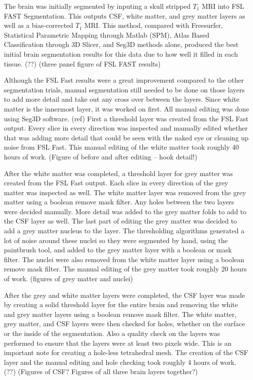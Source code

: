 The brain was initially segmented by inputing a skull stripped $T_1$ MRI into FSL FAST Segmentation. This outputs CSF, white matter, and grey matter layers as well as a bias-corrected $T_1$ MRI. This method, compared with Freesurfer, Statistical Parametric Mapping through Matlab (SPM), Atlas Based Classification through 3D Slicer, and Seg3D methods alone, produced the best initial brain segmentation results for this data due to how well it filled in each tissue. (??) (three panel figure of FSL FAST results)

Although the FSL Fast results were a great improvement compared to the other segmentation trials, manual segmentation still needed to be done on those layers to add more detail and take out any cross over between the layers. Since white matter is the innermost layer, it was worked on first. All manual editing was done using Seg3D software. (ref) First a threshold layer was created from the FSL Fast output. Every slice in every direction was inspected and manually edited whether that was adding more detail that could be seen with the naked eye or cleaning up noise from FSL Fast. This manual editing of the white matter took roughly 40 hours of work. (Figure of before and after editing -- hook detail!) 

After the white matter was completed, a threshold layer for grey matter was created from the FSL Fast output. Each slice in every direction of the grey matter was inspected as well. The white matter layer was removed from the grey matter using a boolean remove mask filter. Any holes between the two layers were decided manually. More detail was added to the grey matter folds to add to the CSF layer as well. The last part of editing the grey matter was decided to add a grey matter nucleus to the layer. The thresholding algorithms generated a lot of noise around these nuclei so they were segmented by hand, using the paintbrush tool, and added to the grey matter layer with a boolean or mask filter. The nuclei were also removed from the white matter layer using a boolean remove mask filter. The manual editing of the grey matter took roughly 20 hours of work. (figures of grey matter and nuclei)

After the grey and white matter layers were completed, the CSF layer was made by creating a solid threshold layer for the entire brain and removing the white and grey matter layers using a boolean remove mask filter. The white matter, grey matter, and CSF layers were then checked for holes, whether on the surface or the inside of the segmentation. Also a quality check on the layers was performed to ensure that the layers were at least two pixels wide. This is an important note for creating a hole-less tetrahedral mesh. The creation of the CSF layer and the manual editing and hole checking took roughly 4 hours of work. (??) (Figures of CSF? Figures of all three brain layers together?)

